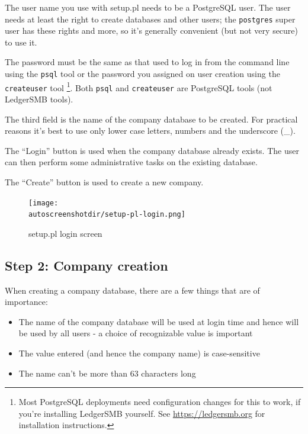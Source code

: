 The user name you use with setup.pl needs to be a PostgreSQL user. The user needs at least the
right to create databases and other users; the \texttt{postgres} super user has these rights
and more, so it's generally convenient (but not very secure) to use it.

The password must be the same as that used to log in from the command line using the
\texttt{psql}  tool or the password you assigned on user creation 
using the \texttt{createuser}  tool
\footnote{Most PostgreSQL deployments need configuration changes for this to work, if
you're installing LedgerSMB yourself. See \url{https://ledgersmb.org} for installation
instructions.}. Both \texttt{psql} and \texttt{createuser} are PostgreSQL tools (not LedgerSMB tools).

The third field is the name of the company database to be created. For practical reasons
it's best to use only lower case letters, numbers and the underscore (\_).

The ``Login'' button is used when the company database already exists.  The user can then
perform some administrative tasks on the existing database.

The ``Create'' button is used to create a new company.

\begin{figure}[H]
\centering
\texttt{[image: \\autoscreenshotdir/setup-pl-login.png]}
\caption{setup.pl login screen}
\label{fig:setup-step1}
\end{figure}

\subsection{Step 2: Company creation}
\label{subsec-create-setup-create}

When creating a company database, there are a few things that are of importance:

\begin{itemize}
\item The name of the company database will be used at login time and hence
   will be used by all users - a choice of recognizable value is important
\item The value entered (and hence the company name) is case-sensitive
\item The name can't be more than 63 characters long
\end{itemize}

